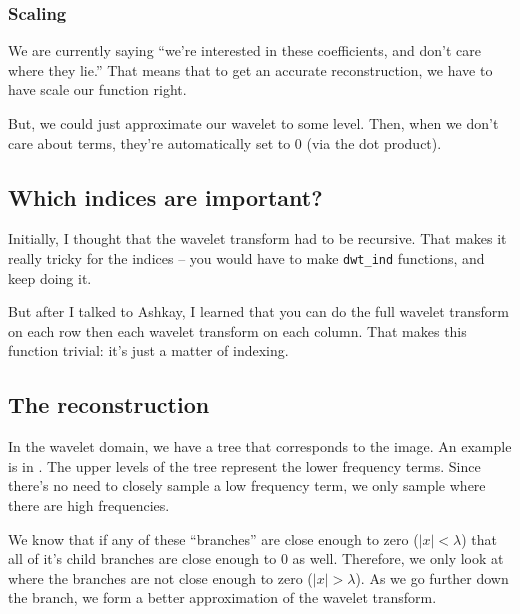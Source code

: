 \documentclass[leqno]{article}
\begin{document}
                \subsubsection{Scaling}
                    We are currently saying ``we're interested in these coefficients, and don't care where they lie.'' That means that to get an accurate reconstruction, we have to have scale our function right.

                    But, we could just approximate our wavelet to some level. Then, when we don't care about terms, they're automatically set to 0 (via the dot product).


        \subsection{Which indices are important?}
            Initially, I thought that the wavelet transform had to be recursive. That makes it really tricky for the indices -- you would have to make \texttt{dwt\_ind} functions, and keep doing it. 

            But after I talked to Ashkay, I learned that you can do the full wavelet transform on each row then each wavelet transform on each column. That makes this function trivial: it's just a matter of indexing. 

        \subsection{The reconstruction}
            In the wavelet domain, we have a tree that corresponds to the image. An example is in . The upper levels of the tree represent the lower frequency terms. Since there's no need to closely sample a low frequency term, we only sample where there are high frequencies. 

            We know that if any of these ``branches'' are close enough to zero ($|x| < \lambda$) that all of it's child branches are close enough to 0 as well. Therefore, we only look at where the branches are not close enough to zero ($|x| > \lambda$). As we go further down the branch, we form a better approximation of the wavelet transform.
            
\end{document}
